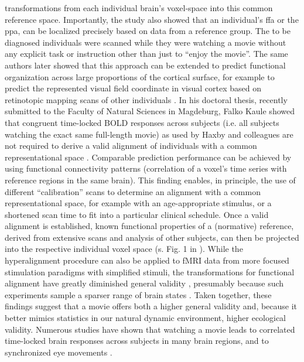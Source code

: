 transformations from each individual brain’s voxel-space into this common
reference space.
%
Importantly, the study also showed that an individual's \ac{ffa} or the
\ac{ppa}, can be localized precisely based on data from a reference group.
%
The to be diagnosed individuals were scanned while they were watching a movie
without any explicit task or instruction other than just to ``enjoy the movie''.
%
The same authors later showed that this approach can be extended to predict
functional organization across large proportions of the cortical surface, for
example to predict the represented visual field coordinate in visual cortex
based on retinotopic mapping scans of other individuals
\citep{guntupalli2016model}.
%
In his doctoral thesis, recently submitted to the Faculty of Natural Sciences in
Magdeburg, Falko Kaule showed that congruent time-locked BOLD responses across
subjects (i.e. all subjects watching the exact same full-length movie) as used
by Haxby and colleagues are not required to derive a valid alignment of
individuals with a common representational space \citep{kaule2017examination}.
%
Comparable prediction performance can be achieved by using functional
connectivity patterns (correlation of a voxel's time series with reference
regions in the same brain).
%
This finding enables, in principle, the use of different ``calibration'' scans
to determine an alignment with a common representational space, for example with
an age-appropriate stimulus, or a shortened scan time to fit into a particular
clinical schedule.
%
Once a valid alignment is established, known functional properties of a
(normative) reference, derived from extensive scans and analysis of other
subjects, can then be projected into the respective individual voxel space (s.
Fig. 1 in \citep{nishimoto2016lining}).
%
While the hyperalignment procedure can also be applied to fMRI data from more
focused stimulation paradigms with simplified stimuli, the transformations for
functional alignment have greatly diminished general validity
\citep{haxby2011common}, presumably because such experiments sample a sparser
range of brain states \citep{guntupalli2016model}.
%
Taken together, these findings suggest that a movie offers both a higher general
validity and, because it better mimics statistics in our natural dynamic
environment, higher ecological validity. Numerous studies have shown that
watching a movie leads to correlated time-locked brain responses across subjects
in many brain regions, and to synchronized eye movements
\citep{hasson2010reliability, lankinen2014isc-meg}.
